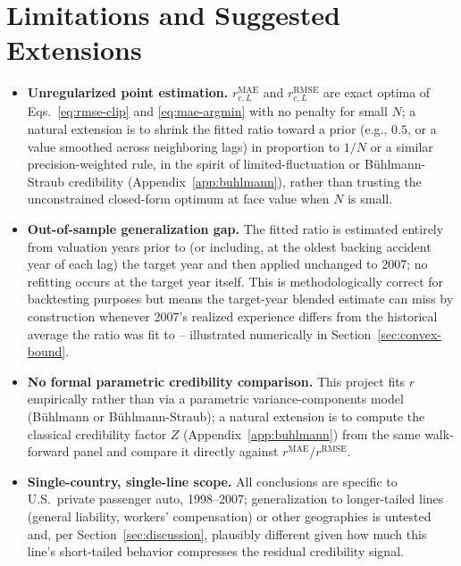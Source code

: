 \documentclass[11pt]{article}
\newcommand{\rmae}{r^{\text{MAE}}}
\newcommand{\rrmse}{r^{\text{RMSE}}}
\begin{document}
\section{Limitations and Suggested Extensions}
\label{sec:limitations}

\begin{itemize}
\item \textbf{Unregularized point estimation.} $\rmae_{c,L}$ and $\rrmse_{c,L}$ are exact optima
  of Eqs.~\eqref{eq:rmse-clip} and \eqref{eq:mae-argmin} with no penalty for small $N$; a natural
  extension is to shrink the fitted ratio toward a prior (e.g., $0.5$, or a value smoothed across
  neighboring lags) in proportion to $1/N$ or a similar precision-weighted rule, in the spirit of
  limited-fluctuation or Bühlmann-Straub credibility (Appendix~\ref{app:buhlmann}), rather than
  trusting the unconstrained closed-form optimum at face value when $N$ is small.
\item \textbf{Out-of-sample generalization gap.} The fitted ratio is estimated entirely from
  valuation years prior to (or including, at the oldest backing accident year of each lag) the
  target year and then applied unchanged to 2007; no refitting occurs at the target year itself.
  This is methodologically correct for backtesting purposes but means the target-year blended
  estimate can miss by construction whenever 2007's realized experience differs from the historical
  average the ratio was fit to -- illustrated numerically in Section~\ref{sec:convex-bound}.
\item \textbf{No formal parametric credibility comparison.} This project fits $r$ empirically
  rather than via a parametric variance-components model (Bühlmann or Bühlmann-Straub); a natural
  extension is to compute the classical credibility factor $Z$ (Appendix~\ref{app:buhlmann}) from
  the same walk-forward panel and compare it directly against $\rmae$/$\rrmse$.
\item \textbf{Single-country, single-line scope.} All conclusions are specific to U.S.\ private
  passenger auto, 1998--2007; generalization to longer-tailed lines (general liability, workers'
  compensation) or other geographies is untested and, per Section~\ref{sec:discussion}, plausibly
  different given how much this line's short-tailed behavior compresses the residual credibility
  signal.
\end{itemize}
\end{document}
